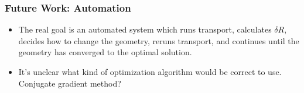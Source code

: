 \documentclass[t]{beamer}
\begin{document}
\begin{frame}
  \frametitle{Future Work: Automation}
  \begin{itemize}
    \item The real goal is an automated system which runs transport, calculates
          $\delta R$, decides how to change the geometry, reruns transport, and
          continues until the geometry has converged to the optimal solution.
    \item It's unclear what kind of optimization algorithm would be correct to
          use. Conjugate gradient method?
  \end{itemize}
\end{frame}
\end{document}
